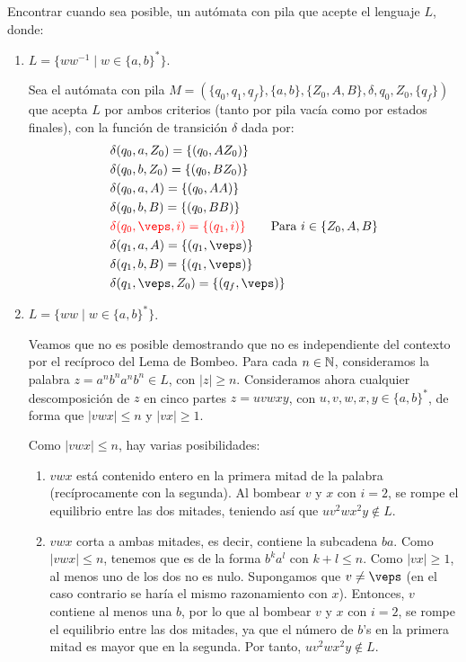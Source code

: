 \begin{ejercicio}\label{ej:1.6.2}
    Encontrar cuando sea posible, un autómata con pila que acepte el lenguaje $L$, donde:
    \begin{enumerate}
        \item $L = \{ww^{-1}\mid w\in {\{a,b\}}^{\ast}\}$.
        
        Sea el autómata con pila $M = (\{q_0,q_1,q_f\},\{a,b\},\{Z_0,A,B\},\delta,q_0,Z_0,\{q_f\})$ que acepta $L$ por ambos criterios (tanto por pila vacía como por estados finales), con la función de transición $\delta$ dada por:
        \begin{align*}
            &\delta(q_0,a,Z_0) = \{(q_0,AZ_0)\} \\
            &\delta(q_0,b,Z_0) = \{(q_0,BZ_0)\} \\
            &\delta(q_0,a,A) = \{(q_0,AA)\} \\
            &\delta(q_0,b,B) = \{(q_0,BB)\} \\
            &\red{\delta(q_0,\veps,i) = \{(q_1,i)\}} \qquad \text{Para } i\in \{Z_0,A,B\} \\
            &\delta(q_1,a,A) = \{(q_1,\veps)\} \\
            &\delta(q_1,b,B) = \{(q_1,\veps)\} \\
            &\delta(q_1,\veps,Z_0) = \{(q_f,\veps)\}
        \end{align*}
        \item $L = \{ww\mid w \in {\{a,b\}}^{\ast}\}$.
        
        Veamos que no es posible demostrando que no es independiente del contexto por el recíproco del Lema de Bombeo. Para cada $n\in \mathbb{N}$, consideramos la palabra $z=a^nb^na^nb^n\in L$, con $|z|\geq n$. Consideramos ahora cualquier descomposición de $z$ en cinco partes $z=uvwxy$, con $u,v,w,x,y\in {\{a,b\}}^{\ast}$, de forma que $|vwx|\leq n$ y $|vx|\geq 1$.

        Como $|vwx|\leq n$, hay varias posibilidades:
        \begin{enumerate}
            \item $vwx$ está contenido entero en la primera mitad de la palabra (recíprocamente con la segunda). Al bombear $v$ y $x$ con $i=2$, se rompe el equilibrio entre las dos mitades, teniendo así que $uv^2wx^2y\notin L$.
            \item $vwx$ corta a ambas mitades, es decir, contiene la subcadena $ba$. Como $|vwx|\leq n$, tenemos que es de la forma $b^k a^l$ con $k+l\leq n$. Como $|vx|\geq 1$, al menos uno de los dos no es nulo. Supongamos que $v\neq \veps$ (en el caso contrario se haría el mismo razonamiento con $x$). Entonces, $v$ contiene al menos una $b$, por lo que al bombear $v$ y $x$ con $i=2$, se rompe el equilibrio entre las dos mitades, ya que el número de $b$'s en la primera mitad es mayor que en la segunda. Por tanto, $uv^2wx^2y\notin L$.
        \end{enumerate}


\end{enumerate}
\end{ejercicio}
